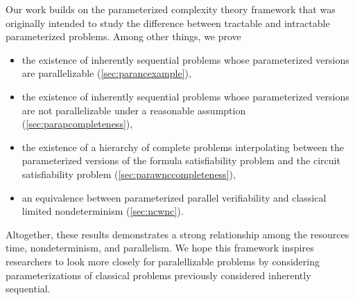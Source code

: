 %
%
%
Our work builds on the parameterized complexity theory framework that was originally intended to study the difference between tractable and intractable parameterized problems.
Among other things, we prove
\begin{itemize}
\item the existence of inherently sequential problems whose parameterized versions are parallelizable (\autoref{sec:parancexample}),
\item the existence of inherently sequential problems whose parameterized versions are not parallelizable under a reasonable assumption (\autoref{sec:parapcompleteness}),
\item the existence of a hierarchy of complete problems interpolating between the parameterized versions of the formula satisfiability problem and the circuit satisfiability problem (\autoref{sec:parawnccompleteness}),
\item an equivalence between parameterized parallel verifiability and classical limited nondeterminism (\autoref{sec:ncwnc}).
\end{itemize}
%
%
%
%
Altogether, these results demonstrates a strong relationship among the resources time, nondeterminism, and parallelism.
%
%
We hope this framework inspires researchers to look more closely for paralellizable problems by considering parameterizations of classical problems previously considered inherently sequential.
